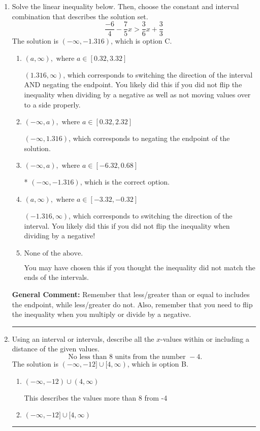 \documentclass{extbook}[14pt]
\newcommand{\litem}[1]{\item #1

\rule{\textwidth}{0.4pt}}
\begin{document}
\begin{enumerate}\litem{
Solve the linear inequality below. Then, choose the constant and interval combination that describes the solution set.
\[ \frac{-6}{4} - \frac{7}{5} x > \frac{3}{6} x + \frac{3}{3} \]
The solution is \( (-\infty, -1.316) \), which is option C.\begin{enumerate}[label=\Alph*.]
\item \( (a, \infty), \text{ where } a \in [0.32, 3.32] \)

 $(1.316, \infty)$, which corresponds to switching the direction of the interval AND negating the endpoint. You likely did this if you did not flip the inequality when dividing by a negative as well as not moving values over to a side properly.
\item \( (-\infty, a), \text{ where } a \in [0.32, 2.32] \)

 $(-\infty, 1.316)$, which corresponds to negating the endpoint of the solution.
\item \( (-\infty, a), \text{ where } a \in [-6.32, 0.68] \)

* $(-\infty, -1.316)$, which is the correct option.
\item \( (a, \infty), \text{ where } a \in [-3.32, -0.32] \)

 $(-1.316, \infty)$, which corresponds to switching the direction of the interval. You likely did this if you did not flip the inequality when dividing by a negative!
\item \( \text{None of the above}. \)

You may have chosen this if you thought the inequality did not match the ends of the intervals.
\end{enumerate}

\textbf{General Comment:} Remember that less/greater than or equal to includes the endpoint, while less/greater do not. Also, remember that you need to flip the inequality when you multiply or divide by a negative.
}
\litem{
Using an interval or intervals, describe all the $x$-values within or including a distance of the given values.
\[ \text{ No less than } 8 \text{ units from the number } -4. \]
The solution is \( (-\infty, -12] \cup [4, \infty) \), which is option B.\begin{enumerate}[label=\Alph*.]
\item \( (-\infty, -12) \cup (4, \infty) \)

This describes the values more than 8 from -4
\item \( (-\infty, -12] \cup [4, \infty) \)


\end{enumerate}}
\end{enumerate}
\end{document}
